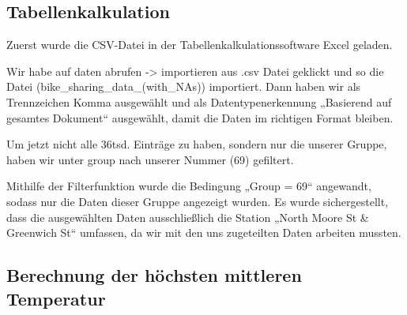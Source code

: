 \documentclass{article}
\begin{document}
\newpage 

\subsection{Tabellenkalkulation}
\label{sec:tabellenkalkulation}


Zuerst wurde die CSV-Datei in der Tabellenkalkulationssoftware Excel geladen. 

Wir habe auf daten abrufen -> importieren aus .csv Datei geklickt und so die Datei (bike\_sharing\_data\_(with\_NAs)) importiert. Dann haben wir als Trennzeichen Komma ausgewählt und als Datentypenerkennung „Basierend auf gesamtes Dokument“ ausgewählt, damit die Daten im richtigen Format bleiben. 

Um jetzt nicht alle 36tsd. Einträge zu haben, sondern nur die unserer Gruppe, haben wir unter group nach unserer Nummer (69) gefiltert. 

Mithilfe der Filterfunktion wurde die Bedingung „Group = 69“ angewandt, sodass nur die Daten dieser Gruppe angezeigt wurden. Es wurde sichergestellt, dass die ausgewählten Daten ausschließlich die Station „North Moore St \& Greenwich St“ umfassen, da wir mit den uns zugeteilten Daten arbeiten mussten.



\newpage 

\subsection{Berechnung der höchsten mittleren Temperatur}
\label{sec:berechnung-temperatur}
\end{document}
